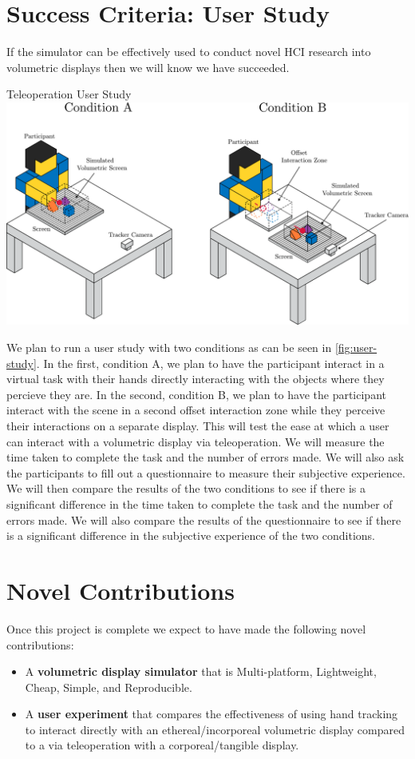 \section{Success Criteria: User Study}
If the simulator can be effectively used to conduct novel HCI research into volumetric displays then we will know we have succeeded. 
\begin{figureBox}[label={fig:user-study}, width=\linewidth]{Teleoperation User Study}
    \includegraphics[width = 0.9\linewidth]{./evaluation plan/figures/user study.pdf}
\end{figureBox}
We plan to run a user study with two conditions as can be seen in \ref{fig:user-study}. In the first, condition A, we plan to have the participant interact in a virtual task with their hands directly interacting with the objects where they percieve they are. In the second, condition B, we plan to have the participant interact with the scene in a second offset interaction zone while they perceive their interactions on a separate display. This will test the ease at which a user can interact with a volumetric display via teleoperation. We will measure the time taken to complete the task and the number of errors made. We will also ask the participants to fill out a questionnaire to measure their subjective experience. We will then compare the results of the two conditions to see if there is a significant difference in the time taken to complete the task and the number of errors made. We will also compare the results of the questionnaire to see if there is a significant difference in the subjective experience of the two conditions.

\section{Novel Contributions}
Once this project is complete we expect to have made the following novel contributions:
\begin{itemize}
    \item A \textbf{volumetric display simulator} that is Multi-platform, Lightweight, Cheap, Simple, and Reproducible.
    \item A \textbf{user experiment} that compares the effectiveness of using hand tracking to interact directly with an ethereal/incorporeal volumetric display compared to a via teleoperation with a corporeal/tangible display.
\end{itemize}
